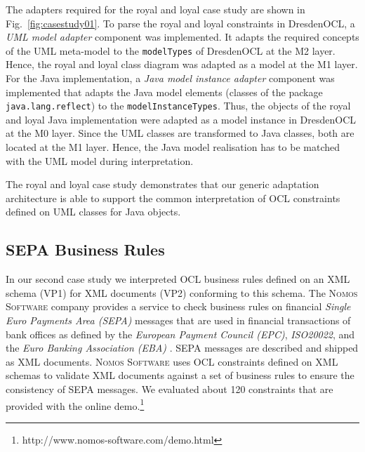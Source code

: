 The adapters required for the royal and loyal case study are shown in Fig.~\ref{fig:casestudy01}. To parse the royal and loyal constraints
in DresdenOCL, a \textit{UML model adapter} component was implemented. It
adapts the required concepts of the UML meta-model to the \texttt{model\-Types}
of DresdenOCL at the M2 layer. Hence, the royal and loyal class diagram was adapted as a model at the M1 layer.
For the Java implementation, a \textit{Java model instance adapter} component was implemented 
that adapts the Java model elements (classes of the package \texttt{java.lang.reflect})
to the \texttt{model\-Instance\-Types}. Thus, the objects of the royal and loyal Java implementation
were adapted as a model instance in DresdenOCL at the M0 layer. 
Since the UML classes are transformed to Java classes, both are located at the M1 layer.
Hence, the Java model realisation has to be matched with the UML model during interpretation.

The royal and loyal case study demonstrates that our generic adaptation architecture is able to 
support the common interpretation of OCL constraints defined on UML classes for Java objects.


\subsection{SEPA Business Rules}

In our second case study we interpreted OCL business rules
defined on an XML schema (VP1) for XML documents (VP2)
conforming to this schema. The \textsc{Nomos Software} company provides a
service to check business rules on financial \textit{Single Euro Payments Area (SEPA)} messages that are 
used in financial transactions of bank offices as defined by the \textit{European
Payment Council (EPC)}, \textit{ISO20022}, and the \textit{Euro Banking Association (EBA)} \cite{spec:UNIFI,spec:EPC,WWW:EBA}. 
SEPA messages are described and shipped as XML documents.
\textsc{Nomos Software} uses OCL constraints defined on XML schemas
to validate XML documents against a set of business rules to ensure the consistency of
SEPA messages. We evaluated about 120 constraints that are provided 
with the online demo.\footnote{http://www.nomos-software.com/demo.html}

